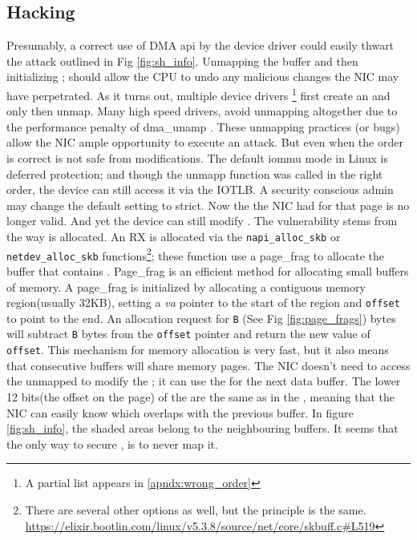 
\subsection{Hacking~\oportunity{}}\label{sec:shinfo}

Presumably, a correct use of DMA api by the device driver could easily thwart the attack outlined in Fig \ref{fig:sh_info}. Unmapping the buffer and then initializing \shinfo; should allow the CPU to undo any malicious changes the NIC may have perpetrated. As it turns out, multiple device drivers \footnote{A partial list appears in \ref{apndx:wrong_order}} first create an \skb and only then unmap. Many high speed drivers, avoid unmapping altogether due to the performance penalty of dma\_unamp \cite{MMT16,MSMT18}. These unmapping practices (or bugs) allow the NIC ample opportunity to execute an attack. But even when the order is correct \shinfo is not safe from modifications. The default iommu mode in Linux is deferred protection; and though the unmapp function was called in the right order, the device can still access it via the IOTLB. A security conscious admin may change the default setting to strict. Now the \iova the NIC had for that page is no longer valid. And yet the device can still modify \shinfo. The vulnerability stems from the way \data is allocated. An RX \skb is allocated via the \texttt{napi\_alloc\_skb} or \texttt{netdev\_alloc\_skb} functions\footnote{There are several other options as well, but the principle is the same. \url{https://elixir.bootlin.com/linux/v5.3.8/source/net/core/skbuff.c\#L519}}; these function use a page\_frag to allocate the \data buffer that contains \shinfo. Page\_frag is an efficient method for allocating small buffers of memory. A page\_frag is initialized by allocating a contiguous memory region(usually 32KB), setting a \textit{va} pointer to the start of the region and \texttt{offset} to point to the end. An allocation request for \texttt{B} (See Fig \ref{fig:page_frags}) bytes will subtract \texttt{B} bytes from the \texttt{offset} pointer and return the new value of  \texttt{offset}. 
This mechanism for memory allocation is very fast, but it also means that consecutive \data buffers will share memory pages. The NIC doesn't need to access the unmapped \iova to modify the \shinfo; it can use the \iova for the next data buffer. The lower 12 bits(the offset on the page) of the \iova  are the same as in the \kva, meaning that the NIC can easily know which \iova overlaps with the previous buffer. In figure \ref{fig:sh_info}, the shaded areas belong to the neighbouring \data buffers. It seems that the only way to secure \shinfo, is to never map it\cite{MSMT18}.

